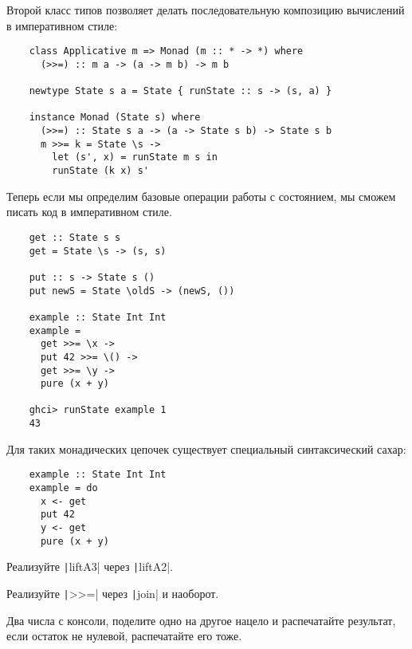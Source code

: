 Второй класс типов позволяет делать последовательную композицию вычислений в императивном стиле:
\begin{verbatim}
    class Applicative m => Monad (m :: * -> *) where
      (>>=) :: m a -> (a -> m b) -> m b

    newtype State s a = State { runState :: s -> (s, a) }

    instance Monad (State s) where
      (>>=) :: State s a -> (a -> State s b) -> State s b
      m >>= k = State \s ->
        let (s', x) = runState m s in
        runState (k x) s'
\end{verbatim}

Теперь если мы определим базовые операции работы с состоянием, мы сможем писать код в императивном стиле.
\begin{verbatim}
    get :: State s s
    get = State \s -> (s, s)

    put :: s -> State s ()
    put newS = State \oldS -> (newS, ())

    example :: State Int Int
    example =
      get >>= \x ->
      put 42 >>= \() ->
      get >>= \y ->
      pure (x + y)

    ghci> runState example 1
    43
\end{verbatim}

Для таких монадических цепочек существует специальный синтаксический сахар:
\begin{verbatim}
    example :: State Int Int
    example = do
      x <- get
      put 42
      y <- get
      pure (x + y)
\end{verbatim}

\begin{task}
    Реализуйте \texttt|liftA3| через \texttt|liftA2|.
\end{task}

\begin{task}
    Реализуйте \texttt|>>=| через \texttt|join| и наоборот.
\end{task}

\begin{task}
    Два числа с консоли, поделите одно на другое нацело и распечатайте результат, если остаток не нулевой, распечатайте его тоже.
\end{task}
